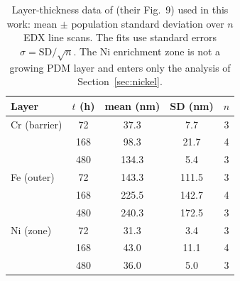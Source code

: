 \documentclass[a4paper,fleqn]{cas-sc}
\begin{document}
\begin{table}[htbp]
\centering
\caption{Layer-thickness data of \citet{veile2024} (their
Fig.~9) used in this work: mean $\pm$ population standard deviation
over $n$ EDX line scans. The fits use standard errors
$\sigma = \mathrm{SD}/\sqrt{n}$. The Ni enrichment zone is not a
growing PDM layer and enters only the analysis of
Section~\ref{sec:nickel}.}
\label{tab:data}
\small
\begin{tabular}{lcccc}
\toprule
Layer & $t$ (h) & mean (nm) & SD (nm) & $n$ \\
\midrule
Cr (barrier) & 72 & 37.3 & 7.7 & 3 \\
 & 168 & 98.3 & 21.7 & 4 \\
 & 480 & 134.3 & 5.4 & 3 \\
Fe (outer) & 72 & 143.3 & 111.5 & 3 \\
 & 168 & 225.5 & 142.7 & 4 \\
 & 480 & 240.3 & 172.5 & 3 \\
Ni (zone) & 72 & 31.3 & 3.4 & 3 \\
 & 168 & 43.0 & 11.1 & 4 \\
 & 480 & 36.0 & 5.0 & 3 \\
\bottomrule
\end{tabular}
\end{table}
\end{document}
